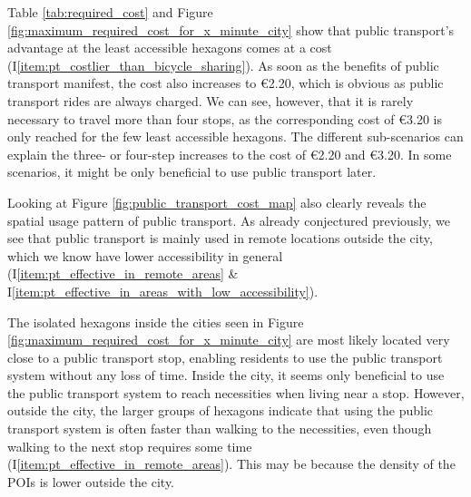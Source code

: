 Table \ref{tab:required_cost} and Figure \ref{fig:maximum_required_cost_for_x_minute_city} show that public transport's advantage at the least accessible hexagons comes at a cost (I\ref{item:pt_costlier_than_bicycle_sharing}).
As soon as the benefits of public transport manifest, the cost also increases to \euro{2.20}, which is obvious as public transport rides are always charged.
We can see, however, that it is rarely necessary to travel more than four stops, as the corresponding cost of \euro{3.20} is only reached for the few least accessible hexagons.
The different sub-scenarios can explain the three- or four-step increases to the cost of \euro{2.20} and \euro{3.20}.
In some scenarios, it might be only beneficial to use public transport later.

Looking at Figure \ref{fig:public_transport_cost_map} also clearly reveals the spatial usage pattern of public transport.
As already conjectured previously, we see that public transport is mainly used in remote locations outside the city, which we know have lower accessibility in general (I\ref{item:pt_effective_in_remote_areas} \& I\ref{item:pt_effective_in_areas_with_low_accessibility}).

The isolated hexagons inside the cities seen in Figure \ref{fig:maximum_required_cost_for_x_minute_city} are most likely located very close to a public transport stop, enabling residents to use the public transport system without any loss of time.
Inside the city, it seems only beneficial to use the public transport system to reach necessities when living near a stop.
However, outside the city, the larger groups of hexagons indicate that using the public transport system is often faster than walking to the necessities, even though walking to the next stop requires some time (I\ref{item:pt_effective_in_remote_areas}).
This may be because the density of the POIs is lower outside the city.

